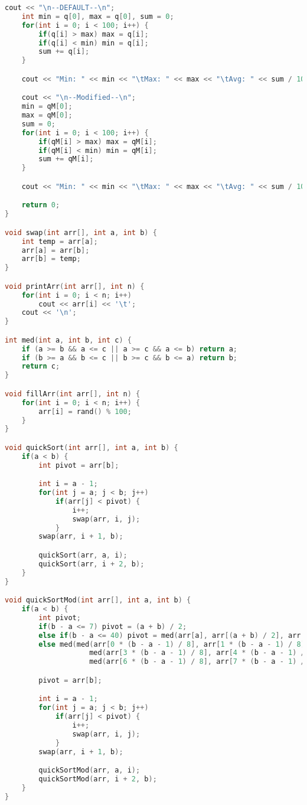 \documentclass[letterpaper, 11pt]{article}
\begin{document}
\begin{lstlisting}[language=c++, caption=main.cpp]
    cout << "\n--DEFAULT--\n";
    int min = q[0], max = q[0], sum = 0;
    for(int i = 0; i < 100; i++) {
        if(q[i] > max) max = q[i];
        if(q[i] < min) min = q[i];
        sum += q[i];
    }

    cout << "Min: " << min << "\tMax: " << max << "\tAvg: " << sum / 100 << '\n';

    cout << "\n--Modified--\n";
    min = qM[0];
    max = qM[0];
    sum = 0;
    for(int i = 0; i < 100; i++) {
        if(qM[i] > max) max = qM[i];
        if(qM[i] < min) min = qM[i];
        sum += qM[i];
    }

    cout << "Min: " << min << "\tMax: " << max << "\tAvg: " << sum / 100 << '\n';

    return 0;
}

void swap(int arr[], int a, int b) {
    int temp = arr[a];
    arr[a] = arr[b];
    arr[b] = temp;
}

void printArr(int arr[], int n) {
    for(int i = 0; i < n; i++)
        cout << arr[i] << '\t';
    cout << '\n';
}

int med(int a, int b, int c) {
    if (a >= b && a <= c || a >= c && a <= b) return a;
    if (b >= a && b <= c || b >= c && b <= a) return b;
    return c;
}

void fillArr(int arr[], int n) {
    for(int i = 0; i < n; i++) {
        arr[i] = rand() % 100;
    }
}

void quickSort(int arr[], int a, int b) {
    if(a < b) {
        int pivot = arr[b];

        int i = a - 1;
        for(int j = a; j < b; j++) 
            if(arr[j] < pivot) {
                i++;
                swap(arr, i, j);
            }
        swap(arr, i + 1, b);

        quickSort(arr, a, i);
        quickSort(arr, i + 2, b);
    }
}

void quickSortMod(int arr[], int a, int b) {
    if(a < b) {
        int pivot;
        if(b - a <= 7) pivot = (a + b) / 2;
        else if(b - a <= 40) pivot = med(arr[a], arr[(a + b) / 2], arr[b]);
        else med(med(arr[0 * (b - a - 1) / 8], arr[1 * (b - a - 1) / 8], arr[2 * (b - a - 1) / 8]), 
                    med(arr[3 * (b - a - 1) / 8], arr[4 * (b - a - 1) / 8], arr[5 * (b - a - 1) / 8]), 
                    med(arr[6 * (b - a - 1) / 8], arr[7 * (b - a - 1) / 8], arr[8 * (b - a - 1) / 8]));

        pivot = arr[b];

        int i = a - 1;
        for(int j = a; j < b; j++) 
            if(arr[j] < pivot) {
                i++;
                swap(arr, i, j);
            }
        swap(arr, i + 1, b);

        quickSortMod(arr, a, i);
        quickSortMod(arr, i + 2, b);
    }
}    
\end{lstlisting}
\end{document}
